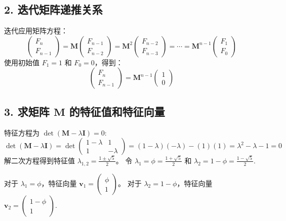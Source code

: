 \documentclass{article}
\begin{document}
\subsection*{2. 迭代矩阵递推关系}

迭代应用矩阵方程：
$$ \begin{pmatrix} F_n \\ F_{n-1} \end{pmatrix} = \mathbf{M} \begin{pmatrix} F_{n-1} \\ F_{n-2} \end{pmatrix} = \mathbf{M}^2 \begin{pmatrix} F_{n-2} \\ F_{n-3} \end{pmatrix} = \cdots = \mathbf{M}^{n-1} \begin{pmatrix} F_1 \\ F_0 \end{pmatrix} $$
使用初始值 $F_1 = 1$ 和 $F_0 = 0$，得到：
$$ \begin{pmatrix} F_n \\ F_{n-1} \end{pmatrix} = \mathbf{M}^{n-1} \begin{pmatrix} 1 \\ 0 \end{pmatrix} $$

\subsection*{3. 求矩阵 $\mathbf{M}$ 的特征值和特征向量}

特征方程为 $\det(\mathbf{M} - \lambda \mathbf{I}) = 0$:
$$ \det(\mathbf{M} - \lambda \mathbf{I}) = \det \begin{pmatrix} 1-\lambda & 1 \\ 1 & -\lambda \end{pmatrix} = (1-\lambda)(-\lambda) - (1)(1) = \lambda^2 - \lambda - 1 = 0 $$
解二次方程得到特征值 $\lambda_{1,2} = \frac{1 \pm \sqrt{5}}{2}$。
令 $\lambda_1 = \phi = \frac{1 + \sqrt{5}}{2}$ 和 $\lambda_2 = 1-\phi = \frac{1 - \sqrt{5}}{2}$.

对于 $\lambda_1 = \phi$，特征向量 $\mathbf{v}_1 = \begin{pmatrix} \phi \\ 1 \end{pmatrix}$。
对于 $\lambda_2 = 1-\phi$，特征向量 $\mathbf{v}_2 = \begin{pmatrix} 1-\phi \\ 1 \end{pmatrix}$.
\end{document}
